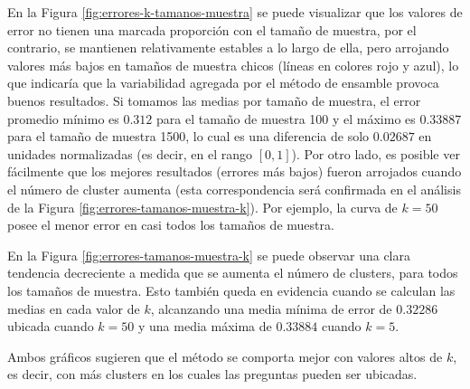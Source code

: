 \bigskip En la Figura \ref{fig:errores-k-tamanos-muestra} se puede visualizar que los valores de error no tienen una marcada proporción con el tamaño de muestra, por el contrario, se mantienen relativamente estables a lo largo de ella, pero arrojando valores más bajos en tamaños de muestra chicos (líneas en colores rojo y azul), lo que indicaría que la variabilidad agregada por el método de ensamble provoca buenos resultados. Si tomamos las medias por tamaño de muestra, el error promedio mínimo es \(0.312\) para el tamaño de muestra 100 y el máximo es \(0.33887\) para el tamaño de muestra 1500, lo cual es una diferencia de solo \(0.02687\) en unidades normalizadas (es decir, en el rango \([0, 1]\)). Por otro lado, es posible ver fácilmente que los mejores resultados (errores más bajos) fueron arrojados cuando el número de cluster aumenta (esta correspondencia será confirmada en el análisis de la Figura \ref{fig:errores-tamanos-muestra-k}). Por ejemplo, la curva de \(k = 50\) posee el menor error en casi todos los tamaños de muestra.

\bigskip En la Figura \ref{fig:errores-tamanos-muestra-k} se puede observar una clara tendencia decreciente a medida que se aumenta el número de clusters, para todos los tamaños de muestra. Esto también queda en evidencia cuando se calculan las medias en cada valor de \(k\), alcanzando una media mínima de error de \(0.32286\) ubicada cuando \(k = 50\) y una media máxima de \(0.33884\) cuando \(k = 5\).

\bigskip Ambos gráficos sugieren que el método se comporta mejor con valores altos de \(k\), es decir, con más clusters en los cuales las preguntas pueden ser ubicadas.